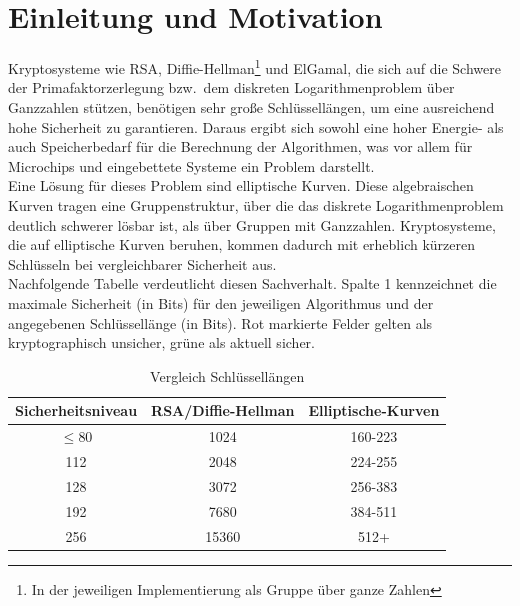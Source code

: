 \documentclass[hidelinks]{article}
\theoremstyle{plain}
\theoremstyle{definition}
\theoremstyle{rem}
\begin{document}
\begin{sloppypar}

\section{Einleitung und Motivation}
Kryptosysteme wie RSA, Diffie-Hellman\footnote{In der jeweiligen Implementierung als Gruppe über ganze Zahlen} und ElGamal\footnotemark[\value{footnote}], die sich auf die Schwere der Primafaktorzerlegung bzw.\ dem diskreten Logarithmenproblem über Ganzzahlen stützen, benötigen sehr große Schlüssellängen, um eine ausreichend hohe Sicherheit zu garantieren. 
Daraus ergibt sich sowohl eine hoher Energie- als auch Speicherbedarf für die Berechnung der Algorithmen, was vor allem für Microchips und eingebettete Systeme ein Problem darstellt.\\
Eine Lösung für dieses Problem sind elliptische Kurven. Diese algebraischen Kurven tragen eine Gruppenstruktur, über die das diskrete Logarithmenproblem deutlich schwerer lösbar ist, als über Gruppen mit Ganzzahlen.
Kryptosysteme, die auf elliptische Kurven beruhen, kommen dadurch mit erheblich kürzeren Schlüsseln bei vergleichbarer Sicherheit aus.\cite[Seite~53]{nist}\\
Nachfolgende Tabelle verdeutlicht diesen Sachverhalt. Spalte 1 kennzeichnet die maximale Sicherheit (in Bits) für den jeweiligen Algorithmus und der angegebenen Schlüssellänge (in Bits). Rot markierte Felder gelten als kryptographisch unsicher, grüne als aktuell sicher.
\begin{table}[h]
\centering
	\begin{tabular}{| c | c | c |}
	\hline
	\rowcolor{lightblue}
	Sicherheitsniveau & RSA/Diffie-Hellman\footnotemark[\value{footnote}] & Elliptische-Kurven\\ \hline
	\rowcolor{lightred}
	$\le80$ 	& 1024 & 160-223 \\ \hline
	\rowcolor{lightgreen}
	112 	& 2048 & 224-255 \\ \hline
	\rowcolor{lightgreen}
	128 	& 3072 & 256-383 \\ \hline
	\rowcolor{lightgreen}
	192 	& 7680 & 384-511 \\ \hline
	\rowcolor{lightgreen}
	256 	& 15360 & 512+ \\ \hline
	\end{tabular}
\caption{Vergleich Schlüssellängen}
\end{table}


\end{sloppypar}
\end{document}
